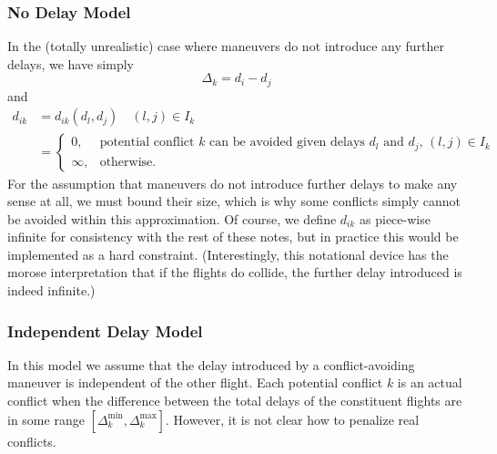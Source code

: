 \documentclass{article}
\begin{document}
\subsubsection{No Delay Model}

In the (totally unrealistic) case where maneuvers do not introduce any further delays, we have simply
\begin{equation*}
  \Delta_k = d_i - d_j
\end{equation*}
and 
\begin{align*}
  d_{ik} &= d_{ik}(d_l, d_j) \quad (l, j) \in I_k \\
  &= 
  \begin{cases} 
    0,      & \text{potential conflict $k$ can be avoided given delays $d_l$ and $d_j$, $(l, j) \in I_k$}\\
    \infty, & \text{otherwise}.
  \end{cases}
\end{align*}
For the assumption that maneuvers do not introduce further delays to make any sense at all, we must bound their size, which is why some conflicts simply cannot be avoided within this approximation.
Of course, we define $d_{ik}$ as piece-wise infinite for consistency with the rest of these notes, but in practice this would be implemented as a hard constraint.
(Interestingly, this notational device has the morose interpretation that if the flights do collide, the further delay introduced is indeed infinite.)

\subsubsection{Independent Delay Model}
In this model we assume that the delay introduced by a conflict-avoiding 
maneuver is independent of the other flight. 
Each potential conflict $k$ is an actual conflict when the difference between the total delays of the constituent flights are in some range $\left[\Delta_k^{\mathrm{min}}, \Delta_k^{\mathrm{max}}\right]$.
However, it is not clear how to penalize real conflicts.
\end{document}
